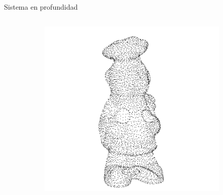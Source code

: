 \documentclass[]{beamer}
\begin{document}
\begin{frame}[fragile]{Sistema en profundidad}
\begin{columns}
\begin{column}{5cm}
{\begin{figure}
\begin{subfigure}[b]{\textwidth}
                		\includegraphics[scale=0.1]{img/nubes/chef_01.png}
                	\end{subfigure}
                \end{figure}
            }

\end{column}
\end{columns}
\end{frame}
\end{document}
